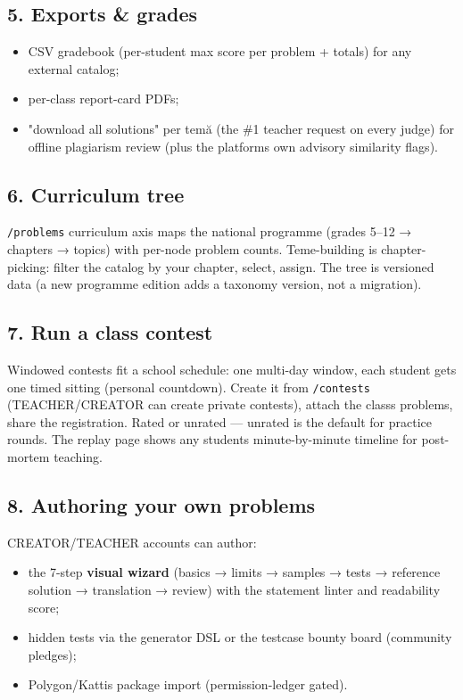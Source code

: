 \documentclass[
]{article}
\providecommand{\tightlist}{%
  \setlength{\itemsep}{0pt}\setlength{\parskip}{0pt}}
\begin{document}
\subsection{5. Exports \& grades}\label{5-exports--grades}

\begin{itemize}
\tightlist
\item
  CSV gradebook (per-student max score per problem + totals) for any
  external catalog;
\item
  per-class report-card PDFs;
\item
  "download all solutions" per temă (the \#1 teacher request on every
  judge) for offline plagiarism review (plus the
  platform\textquotesingle s own advisory similarity flags).
\end{itemize}

\subsection{6. Curriculum tree}\label{6-curriculum-tree}

\texttt{/problems} curriculum axis maps the national programme (grades
5--12 → chapters → topics) with per-node problem counts. Teme-building
is chapter-picking: filter the catalog by your chapter, select, assign.
The tree is versioned data (a new programme edition adds a taxonomy
version, not a migration).

\subsection{7. Run a class contest}\label{7-run-a-class-contest}

Windowed contests fit a school schedule: one multi-day window, each
student gets one timed sitting (personal countdown). Create it from
\texttt{/contests} (TEACHER/CREATOR can create private contests), attach
the class\textquotesingle s problems, share the registration. Rated or
unrated --- unrated is the default for practice rounds. The replay page
shows any student\textquotesingle s minute-by-minute timeline for
post-mortem teaching.

\subsection{8. Authoring your own
problems}\label{8-authoring-your-own-problems}

CREATOR/TEACHER accounts can author:

\begin{itemize}
\tightlist
\item
  the 7-step \textbf{visual wizard} (basics → limits → samples → tests →
  reference solution → translation → review) with the statement linter
  and readability score;
\item
  hidden tests via the generator DSL or the testcase bounty board
  (community pledges);
\item
  Polygon/Kattis package import (permission-ledger gated).
\end{itemize}
\end{document}

